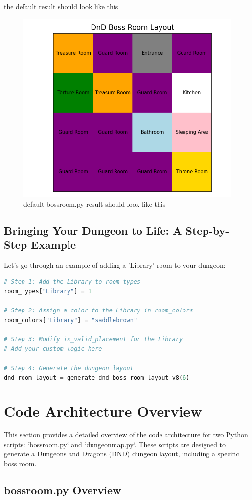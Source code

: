 \documentclass[10pt,twocolumn]{article}
\begin{document}
the default result should look like this
\begin{figure}
    \centering
    \includegraphics[width=0.5\linewidth]{bossroom.png}
    \caption{default bossroom.py result should look like this}
    \label{fig:enter-label}
\end{figure}
\subsection{Bringing Your Dungeon to Life: A Step-by-Step Example}
Let's go through an example of adding a 'Library' room to your dungeon:

\begin{lstlisting}[language=Python]
# Step 1: Add the Library to room_types
room_types["Library"] = 1

# Step 2: Assign a color to the Library in room_colors
room_colors["Library"] = "saddlebrown"

# Step 3: Modify is_valid_placement for the Library
# Add your custom logic here

# Step 4: Generate the dungeon layout
dnd_room_layout = generate_dnd_boss_room_layout_v8(6)
\end{lstlisting}



\section{Code Architecture Overview}

This section provides a detailed overview of the code architecture for two Python scripts: `bossroom.py` and `dungeonmap.py`. These scripts are designed to generate a Dungeons and Dragons (DND) dungeon layout, including a specific boss room.

\subsection{bossroom.py Overview}
\end{document}

